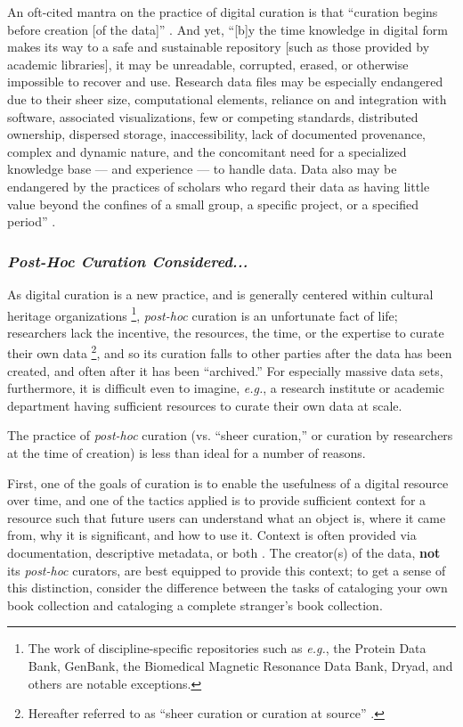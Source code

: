 \documentclass[12pt,letterpaper,titlepage,onecolumn,biblatex,backend=biber,style=chicago-authordate]{article}
\begin{document}
An oft-cited mantra on the practice of digital curation is that
``curation begins before creation [of the data]''
\autocite{rusbridge:curation}. And yet, ``[b]y the time knowledge in
digital form makes its way to a safe and sustainable repository [such
  as those provided by academic libraries], it may be unreadable,
corrupted, erased, or otherwise impossible to recover and
use. Research data files may be especially endangered due to their
sheer size, computational elements, reliance on and integration with
software, associated visualizations, few or competing standards,
distributed ownership, dispersed storage, inaccessibility, lack of
documented provenance, complex and dynamic nature, and the concomitant
need for a specialized knowledge base --- and experience --- to handle
data.  Data also may be endangered by the practices of scholars who
regard their data as having little value beyond the confines of a
small group, a specific project, or a specified period''
\autocite{ogburn:imperative}.

\subsubsection{\textit{Post-Hoc Curation Considered...}}

As digital curation is a new practice, and is generally centered
within cultural heritage organizations \footnote{The work of
  discipline-specific repositories such as \textit{e.g.}, the Protein Data Bank,
  GenBank, the Biomedical Magnetic Resonance Data Bank, Dryad, and others
  are notable exceptions.}, \textit{post-hoc} curation is an unfortunate
fact of life; researchers lack the incentive, the resources, the time,
or the expertise to curate their own data \footnote{Hereafter referred
  to as ``sheer curation or curation at source''
  \autocite{curry:community}.}, and so its curation falls to other parties
after the data has been created, and often after it has been
``archived.'' For especially massive data sets, furthermore, it is difficult
even to imagine, \textit{e.g.}, a research institute or academic department
having sufficient resources to curate their own data at scale.

The practice of \textit{post-hoc} curation (vs. ``sheer curation,'' or
curation by researchers at the time of creation) is less than ideal
for a number of reasons.

First, one of the goals of curation is to enable the usefulness of a
digital resource over time, and one of the tactics applied is to
provide sufficient context for a resource such that future users can
understand what an object is, where it came from, why it is
significant, and how to use it. Context is often provided via
documentation, descriptive metadata, or both
\autocite{arl:stewardship,heidorn:libraries,curry:community,jisc:deluge}. The
creator(s) of the data, \textbf{not} its \textit{post-hoc} curators,
are best equipped to provide this context; to get a sense of this
distinction, consider the difference between the tasks of cataloging
your own book collection and cataloging a complete stranger's book
collection.
\end{document}
